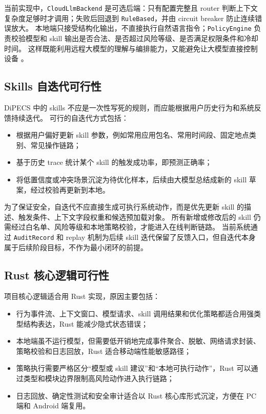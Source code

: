 \documentclass[12pt,a4paper]{article}
\begin{document}
当前实现中，\texttt{CloudLlmBackend} 是可选后端：只有配置完整且 router 判断上下文复杂度足够时才调用；失败后回退到 \texttt{RuleBased}，并由 circuit breaker 防止连续错误放大。
本地端只接受结构化输出，不直接执行自然语言指令；\texttt{PolicyEngine} 负责校验模型和 skill 输出是否合法、是否超过风险等级、是否满足权限条件和冷却时间。
这样既能利用远程大模型的理解与编排能力，又能避免让大模型直接控制设备 \cite{os-copilot,os-copilot-page}。

\subsection{Skills 自迭代可行性}\label{subsec:skill-iteration}

DiPECS 中的 skills 不应是一次性写死的规则，而应能根据用户历史行为和系统反馈持续迭代。
可行的自迭代方式包括：

\begin{itemize}
  \item 根据用户偏好更新 skill 参数，例如常用应用包名、常用时间段、固定地点类别、常见操作链路；
  \item 基于历史 trace 统计某个 skill 的触发成功率，即预测正确率；
  \item 将低置信度或冲突场景沉淀为待优化样本，后续由大模型总结成新的 skill 草案，经过校验再更新到本地。
\end{itemize}

为了保证安全，自迭代不应直接生成可执行系统动作，而是优先更新 skill 的描述、触发条件、上下文字段权重和候选预加载对象。
所有新增或修改后的 skill 仍需经过白名单、风险等级和本地策略校验，才能进入在线判断链路。
当前系统通过 \texttt{AuditRecord} 和 replay 机制为后续 skill 迭代保留了反馈入口，但自迭代本身属于后续阶段目标，不作为最小闭环的前提。

\subsection{Rust 核心逻辑可行性}\label{subsec:rust-core}

项目核心逻辑适合用 Rust 实现，原因主要包括：

\begin{itemize}
  \item 行为事件流、上下文窗口、模型请求、skill 调用结果和优化策略都适合用强类型结构表达，Rust 能减少隐式状态错误；
  \item 本地端虽不运行模型，但需要低开销地完成事件聚合、脱敏、网络请求封装、策略校验和日志回放，Rust 适合移动端性能敏感路径；
  \item 策略执行需要严格区分``模型或 skill 建议''和``本地可执行动作''，Rust 可以通过类型和模块边界限制高风险动作进入执行链路；
  \item 日志回放、确定性测试和安全审计适合以 Rust 核心库形式沉淀，方便在 PC 端和 Android 端复用。
\end{itemize}
\end{document}
